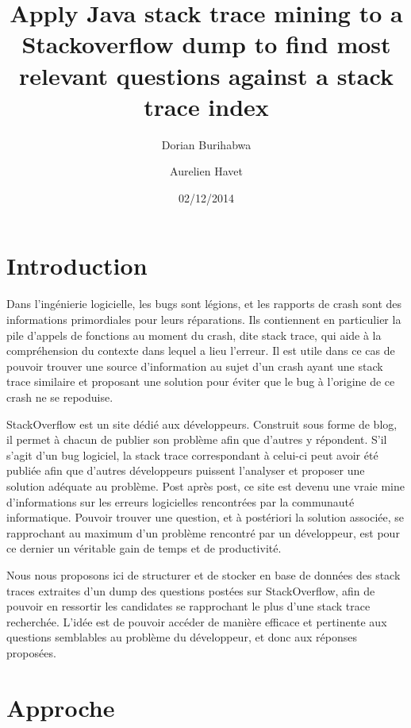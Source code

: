 \documentclass[11pt,a4paper]{article}
\author{Dorian Burihabwa \and Aurelien Havet}
\title{Apply Java stack trace mining to a Stackoverflow dump to find most relevant questions against a stack trace index}
\date{02/12/2014}
\begin{document}
\maketitle
\tableofcontents
\section{Introduction}
Dans l'ingénierie logicielle, les bugs sont légions, et les rapports de crash sont des informations primordiales pour leurs réparations. Ils contiennent en particulier la pile d'appels de fonctions au moment du crash, dite stack trace, qui aide à la compréhension du contexte dans lequel a lieu l'erreur. Il est utile dans ce cas de pouvoir trouver une source d'information au sujet d'un crash ayant une stack trace similaire et proposant une solution pour éviter que le bug à l'origine de ce crash ne se repoduise.

StackOverflow\cite{SO} est un site dédié aux développeurs. Construit sous forme de blog, il permet à chacun de publier son problème afin que d'autres y répondent. S'il s'agit d'un bug logiciel, la stack trace correspondant à celui-ci peut avoir été publiée afin que d'autres développeurs puissent l'analyser et proposer une solution adéquate au problème. Post après post, ce site est devenu une vraie mine d'informations sur les erreurs logicielles rencontrées par la communauté informatique. Pouvoir trouver une question, et à postériori la solution associée, se rapprochant au maximum d'un problème rencontré par un développeur, est pour ce dernier un véritable gain de temps et de productivité.
\newline

Nous nous proposons ici de structurer et de stocker en base de données des stack traces extraites d'un dump des questions postées sur StackOverflow, afin de pouvoir en ressortir les candidates se rapprochant le plus d'une stack trace recherchée. L'idée est de pouvoir accéder de manière efficace et pertinente aux questions semblables au problème du développeur, et donc aux réponses proposées.
\section{Approche}
\end{document}
